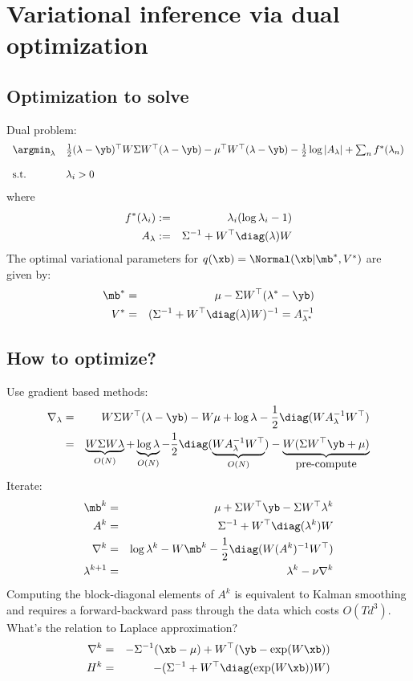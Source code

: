 \documentclass[10pt,english]{article}
\begin{document}
\section{Variational inference via dual optimization}
\subsection{Optimization to solve}
Dual problem:
\begin{eqnarray*}
 \begin{array}{ll} 	\argmin_{\lambda}	&	\frac{1}{2} (\lambda-\yb)^\top W\Sigma W^\top(\lambda-\yb)-\mu^\top W^\top(\lambda-\yb)-\frac{1}{2}\log\vert A_\lambda\vert+\sum_nf^\ast(\lambda_n)\\~\\
			\mbox{s.t.}		&	\lambda_i>0
 \end{array}
\end{eqnarray*}
where 
\begin{eqnarray*}
 f^\ast(\lambda_i)	&:=&		\lambda_i(\log\lambda_i-1)\\
 A_\lambda		&:=&		\Sigma^{-1}+W^\top \diag(\lambda)W
\end{eqnarray*}
The optimal variational parameters for $q(\xb)=\Normal(\xb\vert\mb^\ast,V^\ast)$ are given by:
\begin{eqnarray*}
 \mb^\ast		&=&		\mu-\Sigma W^\top(\lambda^\ast-\yb)\\
 V^\ast			&=&		(\Sigma^{-1}+W^\top \diag(\lambda)W)^{-1}=A_{\lambda^\ast}^{-1}
\end{eqnarray*}
\subsection{How to optimize?}
Use gradient based methods:
\begin{eqnarray*}
 \nabla_\lambda		&=&		W\Sigma W^\top (\lambda-\yb)-W\mu+\log\lambda-\frac{1}{2}\diag(WA^{-1}_\lambda W^\top)\\
			&=&		\underbrace{W\Sigma W \lambda}_{O(N)}+\underbrace{\log\lambda}_{O(N)}-\frac{1}{2}\diag(\underbrace{WA^{-1}_\lambda W^\top}_{O(N)})-\underbrace{W(\Sigma W^\top\yb+\mu)}_{\mbox{pre-compute}}
\end{eqnarray*}
Iterate:
\begin{eqnarray*}
 \mb^k			&=&		\mu+\Sigma W^\top\yb-\Sigma W^\top\lambda^k\\
 A^k			&=&		\Sigma^{-1}+W^\top \diag(\lambda^k)W\\
 \nabla^k		&=&		\log\lambda^k-W\mb^k-\frac{1}{2}\diag(W(A^k)^{-1}W^\top)\\
 \lambda^{k+1}		&=&		\lambda^{k}-\nu \nabla^k
\end{eqnarray*}
Computing the block-diagonal elements of $A^k$ is equivalent to Kalman smoothing and requires a forward-backward pass through the data which costs $O(Td^3)$.\\
What's the relation to Laplace approximation?
\begin{eqnarray*}
 \nabla^k		&=&		-\Sigma^{-1}(\xb-\mu)+W^\top(\yb-\exp(W\xb)) \\
 H^k			&=&		-(\Sigma^{-1}+W^\top \diag(\exp(W\xb))W)
\end{eqnarray*}
\end{document}
